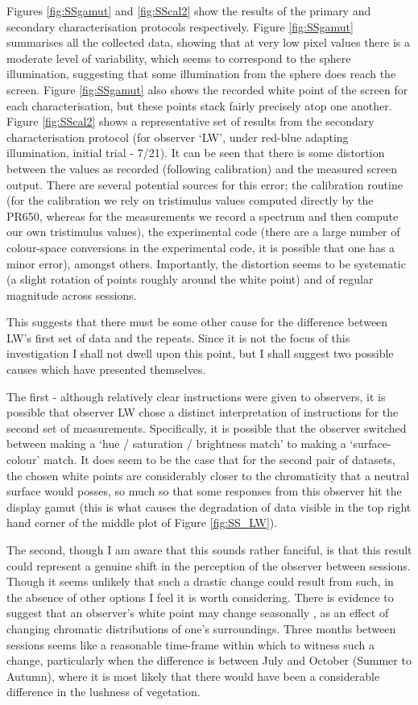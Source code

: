 Figures \ref{fig:SSgamut} and \ref{fig:SScal2} show the results of the primary and secondary characterisation protocols respectively. Figure \ref{fig:SSgamut} summarises all the collected data, showing that at very low pixel values there is a moderate level of variability, which seems to correspond to the sphere illumination, suggesting that some illumination from the sphere does reach the screen. Figure \ref{fig:SSgamut} also shows the recorded white point of the screen for each characterisation, but these points stack fairly precisely atop one another. Figure \ref{fig:SScal2} shows a representative set of results from the secondary characterisation protocol (for observer `LW', under red-blue adapting illumination, initial trial - 7/21). It can be seen that there is some distortion between the values as recorded (following calibration) and the measured screen output. There are several potential sources for this error; the calibration routine (for the calibration we rely on tristimulus values computed directly by the \gls{PR650}, whereas for the measurements we record a spectrum and then compute our own tristimulus values), the experimental code (there are a large number of colour-space conversions in the experimental code, it is possible that one has a minor error), amongst others. Importantly, the distortion seems to be systematic (a slight rotation of points roughly around the white point) and of regular magnitude across sessions.

This suggests that there must be some other cause for the difference between LW's first set of data and the repeats. Since it is not the focus of this investigation I shall not dwell upon this point, but I shall suggest two possible causes which have presented themselves. 

The first - although relatively clear instructions were given to observers, it is possible that observer LW chose a distinct interpretation of instructions for the second set of measurements. Specifically, it is possible that the observer switched between making a `hue / saturation / brightness match' to making a `surface-colour' match. It does seem to be the case that for the second pair of datasets, the chosen white points are considerably closer to the chromaticity that a neutral surface would posses, so much so that some responses from this observer hit the display gamut (this is what causes the degradation of data visible in the top right hand corner of the middle plot of Figure \ref{fig:SS_LW}).

The second, though I am aware that this sounds rather fanciful, is that this result could represent a genuine shift in the perception of the observer between sessions. Though it seems unlikely that such a drastic change could result from such, in the absence of other options I feel it is worth considering. There is evidence to suggest that an observer's white point may change seasonally \cite{welbourne_human_2015}, as an effect of changing chromatic distributions of one's surroundings. Three months between sessions seems like a reasonable time-frame within which to witness such a change, particularly when the difference is between July and October (Summer to Autumn), where it is most likely that there would have been a considerable difference in the lushness of vegetation.

